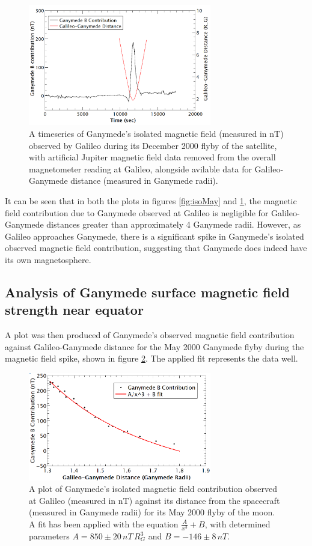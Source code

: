 \documentclass[11pt]{article}
\begin{document}
\begin{figure}[!htb]
    \centering
    \includegraphics[width=8cm]{isoDec.png}
    \captionsetup{width=13cm}
    \caption{A timeseries of Ganymede's isolated magnetic field (measured in nT) observed by Galileo during its December 2000 flyby of the satellite, with artificial Jupiter magnetic field data removed from the overall magnetometer reading at Galileo, alongside avilable data for Galileo-Ganymede distance (measured in Ganymede radii).}
    \label{fig:isoDec}
\end{figure}

\noindent It can be seen that in both the plots in figures \ref{fig:isoMay} and \ref{fig:isoDec}, the magnetic field contribution due to Ganymede observed at Galileo is negligible for Galileo-Ganymede distances greater than approximately 4 Ganymede radii. However, as Galileo approaches Ganymede, there is a significant spike in Ganymede's isolated observed magnetic field contribution, suggesting that Ganymede does indeed have its own magnetosphere. 

\subsection{Analysis of Ganymede surface magnetic field strength near equator}

A plot was then produced of Ganymede's observed magnetic field contribution against Galileo-Ganymede distance for the May 2000 Ganymede flyby during the magnetic field spike, shown in figure \ref{fig:MayDist-Mag}. The applied fit represents the data well.

\begin{figure}[!htb]
    \centering
    \includegraphics[width=8cm]{MayDist-Mag.png}
    \captionsetup{width=13cm}
    \caption{A plot of Ganymede's isolated magnetic field contribution observed at Galileo (measured in nT) against its distance from the spacecraft (measured in Ganymede radii) for its May 2000 flyby of the moon. A fit has been applied with the equation $\frac{A}{x^{3}} + B$, with determined parameters $A = 850 \pm 20\,nT\,R_{G}^{3}$ and $B = -146 \pm 8\,nT$.}
    \label{fig:MayDist-Mag}
\end{figure}
\end{document}

